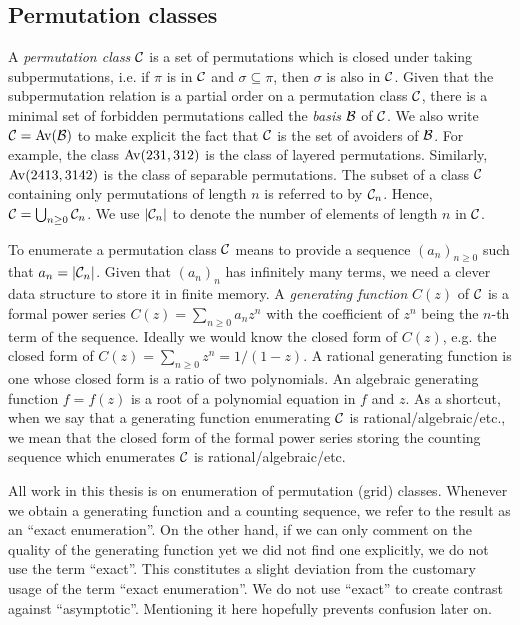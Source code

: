 \documentclass[12pt, a4paper, twoside]{report}
\begin{document}
\subsection{Permutation classes}
A \emph{permutation class} $\mathcal{C}$ is a set of permutations which is closed under taking subpermutations, i.e. if $\pi$ is in $\mathcal{C}$ and $\sigma \subseteq \pi$, then $\sigma$ is also in $\mathcal{C}$. Given that the subpermutation relation is a partial order on a permutation class $\mathcal{C}$, there is a minimal set of forbidden permutations called the \emph{basis} $\mathcal{B}$ of $\mathcal{C}$. We also write $\mathcal{C} = \mathrm{Av}(\mathcal{B})$ to make explicit the fact that $\mathcal{C}$ is the set of avoiders of $\mathcal{B}$. For example, the class $\mathrm{Av}(231,312)$ is the class of layered permutations. Similarly, $\mathrm{Av}(2413, 3142)$ is the class of separable permutations. The subset of a class $\mathcal{C}$ containing only permutations of length $n$ is referred to by $\mathcal{C}_n$. Hence, $\mathcal{C} = \bigcup_{n\geq0}\mathcal{C}_n$. We use $|\mathcal{C}_n|$ to denote the number of elements of length $n$ in $\mathcal{C}$. 

To enumerate a permutation class $\mathcal{C}$ means to provide a sequence $(a_n)_{n\geq 0}$ such that $a_n = |\mathcal{C}_n|$. Given that $(a_n)_n$ has infinitely many terms, we need a clever data structure to store it in finite memory. A \emph{generating function} $C(z)$ of $\mathcal{C}$ is a formal power series $C(z) = \sum_{n\geq 0}a_nz^n$ with the coefficient of $z^n$ being the $n$-th term of the sequence. Ideally we would know the closed form of $C(z)$, e.g. the closed form of $C(z) = \sum_{n\geq 0}z^n = 1/(1-z)$. A rational generating function is one whose closed form is a ratio of two polynomials. An algebraic generating function $f = f(z)$ is a root of a polynomial equation in $f$ and $z$. As a shortcut, when we say that a generating function enumerating $\mathcal{C}$ is rational/algebraic/etc., we mean that the closed form of the formal power series storing the counting sequence which enumerates $\mathcal{C}$ is rational/algebraic/etc.

All work in this thesis is on enumeration of permutation (grid) classes. Whenever we obtain a generating function and a counting sequence, we refer to the result as an ``exact enumeration''. On the other hand, if we can only comment on the quality of the generating function yet we did not find one explicitly, we do not use the term ``exact''. This constitutes a slight deviation from the customary usage of the term ``exact enumeration''. We do not use ``exact'' to create contrast against ``asymptotic''. Mentioning it here hopefully prevents confusion later on.
\end{document}
